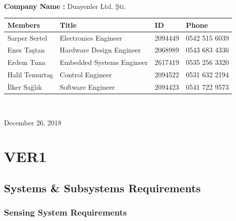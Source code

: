 \documentclass[a4paper,12pt]{article}
\begin{document}
\begin{titlepage}
\begin{minipage}[r]{0.35\textwidth}
\end{minipage}\\[1cm]
\begin{minipage}{\textwidth}
	\begin{flushleft}
		\large{\textbf{Company Name :}}	Duayenler Ltd. Şti.\\
		\begin{table}[H]
			\begin{tabular}{l l l l}
				\hline
				\textbf{Members}&\textbf{Title}& \textbf{ID}&\textbf{Phone} \\ \hline
				Sarper Sertel & Electronics Engineer& 2094449 & 0542 515 6039  \\ 
				Enes Taştan & Hardware Design Engineer & 2068989 & 0543 683 4336  \\ 
				Erdem Tuna & Embedded Systems Engineer& 2617419 & 0535 256 3320  \\ 
				Halil Temurtaş & Control Engineer& 2094522 & 0531 632 2194  \\
				İlker Sağlık & Software Engineer& 2094423 & 0541 722 9573  \\ \hline
				
				
			\end{tabular}
		\end{table}
	\end{flushleft}
\end{minipage}\\[1cm]

\begin{flushbottom}
{\large December 26, 2018} %
\end{flushbottom}

\end{titlepage}

\blankpage
\tableofcontents
\newpage




\section{VER1}

	
	
	\subsection{Systems \& Subsystems Requirements}
		
	
	\subsubsection{Sensing System Requirements}
	
\end{document}
